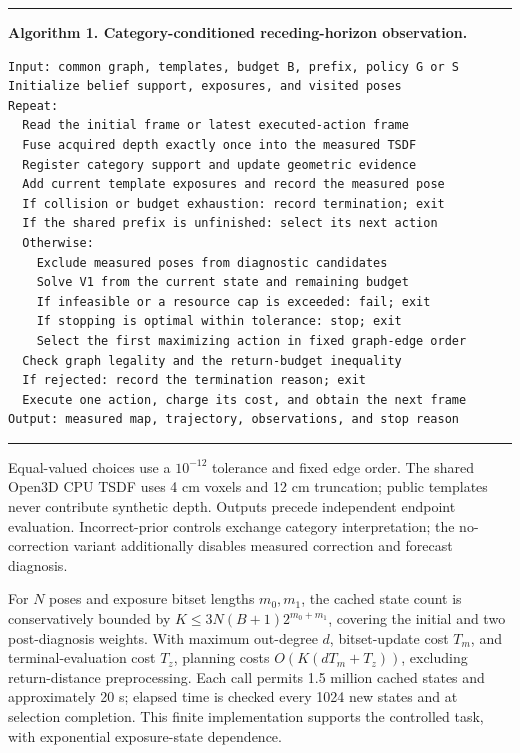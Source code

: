 \par\medskip\noindent\begin{minipage}{\linewidth}
\small\hrule\vspace{0.6em}
\textbf{Algorithm 1. Category-conditioned receding-horizon observation.}

\begin{verbatim}
Input: common graph, templates, budget B, prefix, policy G or S
Initialize belief support, exposures, and visited poses
Repeat:
  Read the initial frame or latest executed-action frame
  Fuse acquired depth exactly once into the measured TSDF
  Register category support and update geometric evidence
  Add current template exposures and record the measured pose
  If collision or budget exhaustion: record termination; exit
  If the shared prefix is unfinished: select its next action
  Otherwise:
    Exclude measured poses from diagnostic candidates
    Solve V1 from the current state and remaining budget
    If infeasible or a resource cap is exceeded: fail; exit
    If stopping is optimal within tolerance: stop; exit
    Select the first maximizing action in fixed graph-edge order
  Check graph legality and the return-budget inequality
  If rejected: record the termination reason; exit
  Execute one action, charge its cost, and obtain the next frame
Output: measured map, trajectory, observations, and stop reason
\end{verbatim}
\vspace{0.4em}\hrule
\end{minipage}\par\medskip


Equal-valued choices use a \(10^{-12}\) tolerance and fixed edge order. The shared Open3D CPU TSDF \cite{ref4,ref11} uses 4 cm voxels and 12 cm truncation; public templates never contribute synthetic depth. Outputs precede independent endpoint evaluation. Incorrect-prior controls exchange category interpretation; the no-correction variant additionally disables measured correction and forecast diagnosis.

For \(N\) poses and exposure bitset lengths \(m_0,m_1\), the cached state count is conservatively bounded by \(K\le3N(B+1)2^{m_0+m_1}\), covering the initial and two post-diagnosis weights. With maximum out-degree \(d\), bitset-update cost \(T_m\), and terminal-evaluation cost \(T_z\), planning costs \(O(K(dT_m+T_z))\), excluding return-distance preprocessing. Each call permits 1.5 million cached states and approximately 20 s; elapsed time is checked every 1024 new states and at selection completion. This finite implementation supports the controlled task, with exponential exposure-state dependence.

